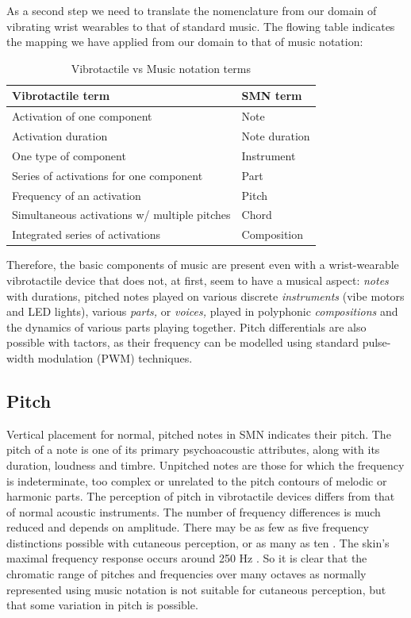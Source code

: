 \documentclass[a4paper, twocolumn]{article}
\begin{document}
As a second step we need to translate the nomenclature from our domain of vibrating wrist wearables to that of standard music. The flowing table indicates the mapping we have applied from our domain to that of music notation:

\begin{table}[htbp]
\caption{Vibrotactile vs Music notation terms}
\small
\centering
\begin{tabular}{@{}ll@{}}
\toprule
Vibrotactile term & SMN term \\ 
\midrule
Activation of one component & Note \\
Activation duration & Note duration \\
One type of component & Instrument \\
Series of activations for one component & Part \\
Frequency of an activation & Pitch \\
Simultaneous activations w/ multiple pitches & Chord \\
Integrated series of activations & Composition \\
\bottomrule
\end{tabular}
\end{table}

Therefore, the basic components of music are present even with a wrist-wearable vibrotactile device that does not, at first, seem to have a musical aspect: \textit{notes} with durations, pitched notes played on various discrete \textit{instruments} (vibe motors and LED lights), various \textit{parts,} or \textit{voices,} played in polyphonic \textit{compositions} and the dynamics of various parts playing together. Pitch differentials are also possible with tactors, as their frequency can be modelled using standard pulse-width modulation (PWM) techniques. \cite{lindeman2006wearable}\\

\subsection{Pitch}
Vertical placement for normal, pitched notes in SMN indicates their pitch. The pitch of a note is one of its primary psychoacoustic attributes, along with its duration, loudness and timbre. Unpitched notes are those for which the frequency is indeterminate, too complex or unrelated to the pitch contours of melodic or harmonic parts. The perception of pitch in vibrotactile devices differs from that of normal acoustic instruments. The number of frequency differences is much reduced and depends on amplitude. There may be as few as five frequency distinctions possible with cutaneous perception, or as many as ten \cite{van2003distilling}. The skin's maximal frequency response occurs around 250 Hz \cite{gunther2003cutaneous}. So it is clear that the chromatic range of pitches and frequencies over many octaves as normally represented using music notation is not suitable for cutaneous perception, but that some variation in pitch is possible. 
\end{document}
